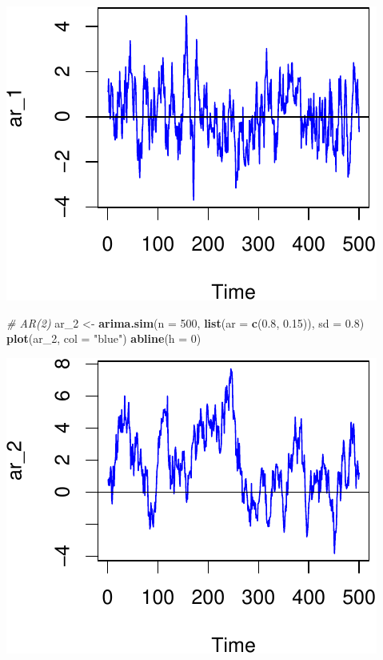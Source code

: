 \documentclass[11pt,]{article}
\newenvironment{Shaded}{\begin{snugshade}}{\end{snugshade}}
\newcommand{\KeywordTok}[1]{\textcolor[rgb]{0.13,0.29,0.53}{\textbf{#1}}}
\newcommand{\DataTypeTok}[1]{\textcolor[rgb]{0.13,0.29,0.53}{#1}}
\newcommand{\DecValTok}[1]{\textcolor[rgb]{0.00,0.00,0.81}{#1}}
\newcommand{\FloatTok}[1]{\textcolor[rgb]{0.00,0.00,0.81}{#1}}
\newcommand{\StringTok}[1]{\textcolor[rgb]{0.31,0.60,0.02}{#1}}
\newcommand{\CommentTok}[1]{\textcolor[rgb]{0.56,0.35,0.01}{\textit{#1}}}
\newcommand{\NormalTok}[1]{#1}
\begin{document}
\begin{center}\includegraphics{FMC_T4_PhD_ARMA_GARCH_files/figure-latex/arima_sim-2} \end{center}

\begin{Shaded}
\begin{Highlighting}[]
\CommentTok{# AR(2)}
\NormalTok{ar_}\DecValTok{2}\NormalTok{ <-}\StringTok{ }\KeywordTok{arima.sim}\NormalTok{(}\DataTypeTok{n =} \DecValTok{500}\NormalTok{, }\KeywordTok{list}\NormalTok{(}\DataTypeTok{ar =} \KeywordTok{c}\NormalTok{(}\FloatTok{0.8}\NormalTok{, }\FloatTok{0.15}\NormalTok{)), }\DataTypeTok{sd =} \FloatTok{0.8}\NormalTok{)}
\KeywordTok{plot}\NormalTok{(ar_}\DecValTok{2}\NormalTok{, }\DataTypeTok{col =} \StringTok{"blue"}\NormalTok{)}
\KeywordTok{abline}\NormalTok{(}\DataTypeTok{h =} \DecValTok{0}\NormalTok{)}
\end{Highlighting}
\end{Shaded}

\begin{center}\includegraphics{FMC_T4_PhD_ARMA_GARCH_files/figure-latex/arima_sim-3} \end{center}
\end{document}
